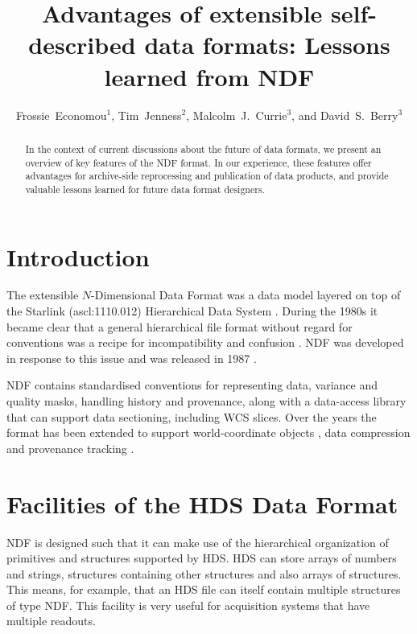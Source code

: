 \documentclass[11pt,twoside]{article}
\begin{document}
\title{Advantages of extensible self-described data formats: Lessons learned from NDF}
\author{Frossie~Economou$^1$, Tim~Jenness$^2$, Malcolm~J.~Currie$^3$,
and David~S.~Berry$^3$
}

\begin{abstract}
  In the context of current discussions about the future of data
  formats, we present an overview of key features of the NDF
  format. In our experience, these features offer advantages for
  archive-side reprocessing and publication of data products, and
  provide valuable lessons learned for future data format designers.
\end{abstract}

\section{Introduction}

The extensible $N$-Dimensional Data Format
\citep[NDF;][]{1993ASPC...52..229W,SGP38} was a data model layered on
top of the Starlink (ascl:1110.012) Hierarchical Data System
\citep[HDS;][]{1982QJRAS..23..485D}. During the 1980s it became clear
that a general hierarchical file format without regard for conventions
was a recipe for incompatibility and confusion \citep[see
e.g.][]{1993ASPC...52..219S}. NDF was developed in response to this
issue and was released in 1987 \citep[see
e.g.][]{1988STARB...2...11C}.

NDF contains standardised conventions for representing data,
variance and quality masks, handling history and provenance, along
with a data-access library that can support data sectioning, including
WCS slices. Over the years the format has been extended to support
world-coordinate objects \citep{2001ASPC..238..129B}, data compression
\citep{2008ASPC..394..650C} and provenance tracking
\citep{2009ASPC..411..418J}.

\section{Facilities of the HDS Data Format}

NDF is designed such that it can make use of the hierarchical
organization of primitives and structures supported by HDS. HDS can
store arrays of numbers and strings, structures containing other
structures and also arrays of structures. This means, for example,
that an HDS file can itself contain multiple structures of type
NDF. This facility is very useful for acquisition systems that have
multiple readouts.
\end{document}
